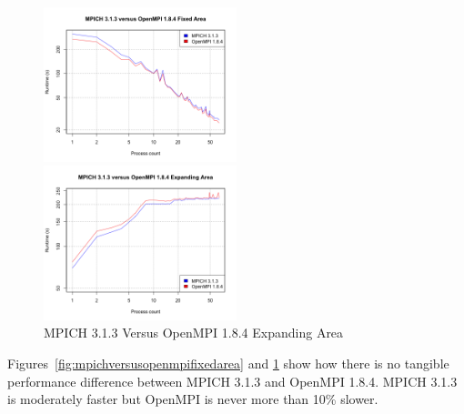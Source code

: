 \begin{figure}
    \includegraphics[width=0.5\textwidth]
    {graphs/MPICH313-OpenMPI184-fixed-area.png}
    \caption{MPICH 3.1.3 Versus OpenMPI 1.8.4 Fixed Area}
    \label{fig:mpichversusopenmpifixedarea}
    \includegraphics[width=0.5\textwidth]
    {graphs/MPICH313-OpenMPI184-expanding-area.png}
    \caption{MPICH 3.1.3 Versus OpenMPI 1.8.4 Expanding Area}
    \label{fig:mpichversusopenmpiexpandingarea}
\end{figure}

Figures~\ref{fig:mpichversusopenmpifixedarea} and
\ref{fig:mpichversusopenmpiexpandingarea} show how there is no tangible
performance difference between MPICH 3.1.3 and OpenMPI 1.8.4. MPICH 3.1.3 is
moderately faster but OpenMPI is never more than 10\% slower.
